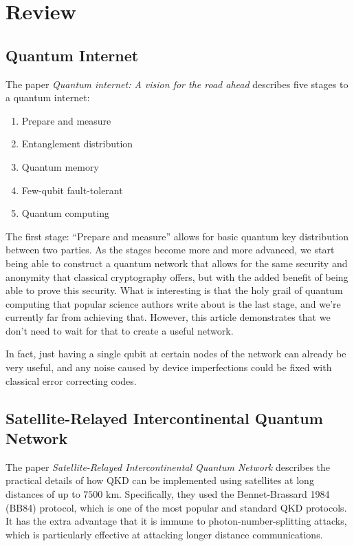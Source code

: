 \documentclass{article}
\numberwithin{equation}{section}
\begin{document}
\section{Review}
\subsection{Quantum Internet}
The paper \textit{Quantum internet: A vision for the road ahead} describes five stages to a quantum internet\cite{Wehner2018}:
\begin{enumerate}
    \item Prepare and measure
    \item Entanglement distribution
    \item Quantum memory
    \item Few-qubit fault-tolerant
    \item Quantum computing
\end{enumerate}
The first stage: ``Prepare and measure'' allows for basic quantum key distribution between two parties. As the stages become more and more advanced, we start being able to construct a quantum network that allows for the same security and anonymity that classical cryptography offers, but with the added benefit of being able to prove this security. What is interesting is that the holy grail of quantum computing that popular science authors write about is the last stage, and we're currently far from achieving that. However, this article demonstrates that we don't need to wait for that to create a useful network.

In fact, just having a single qubit at certain nodes of the network can already be very useful, and any noise caused by device imperfections could be fixed with classical error correcting codes.
\subsection{Satellite-Relayed Intercontinental Quantum Network}
The paper \textit{Satellite-Relayed Intercontinental Quantum Network} describes the practical details of how QKD can be implemented using satellites at long distances of up to $7500\text{ km}$\cite{Liao2018}. Specifically, they used the Bennet-Brassard 1984 (BB84) protocol, which is one of the most popular and standard QKD protocols. It has the extra advantage that it is immune to photon-number-splitting attacks, which is particularly effective at attacking longer distance communications.
\end{document}
